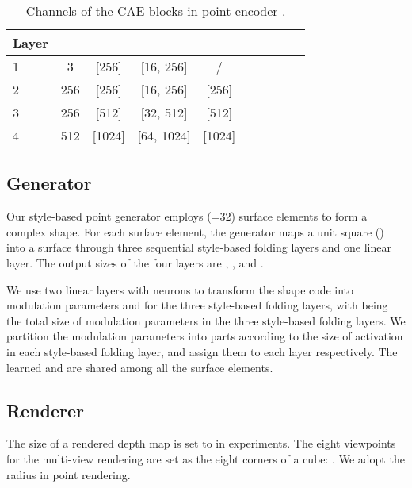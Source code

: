 \documentclass[final]{cvpr}
\begin{document}
\begin{table}[h]
\begin{center}
\footnotesize
\setlength\tabcolsep{1.5pt}
\begin{tabular}{@{}l|cccccccc|c@{}}
\toprule
Layer &  &  &  &  \\
\midrule
1&3&[256]&[16, 256]&/ \\
2&256&[256]&[16, 256]& [256]\\
3&256&[512]&[32, 512]&[512]\\
4&512&[1024]&[64, 1024]&[1024] \\
\bottomrule
\end{tabular}
\end{center}
\caption{Channels of the CAE blocks in point encoder .}
\label{table:network_point_encoder}
\end{table}

\subsection{Generator}
Our {style-based point generator}  employs  (=32) surface elements to form a complex shape. For each surface element, the generator maps a  unit square  () into a  surface through three sequential style-based folding layers and one linear layer. The output sizes of the four layers are , ,  and . 

We use two linear layers with  neurons to transform the shape code  into modulation parameters  and  for the three style-based folding layers, with  being the total size of modulation parameters in the three style-based folding layers. We partition the modulation parameters into parts according to the size of activation  in each style-based folding layer, and assign them to each layer respectively. The learned  and  are shared among all the  surface elements. 

\subsection{Renderer}
The size of a rendered depth map  is set to  in experiments. 
The eight viewpoints for the multi-view rendering are set as the eight corners of a cube: .
We adopt the radius  in point rendering.
\end{document}
